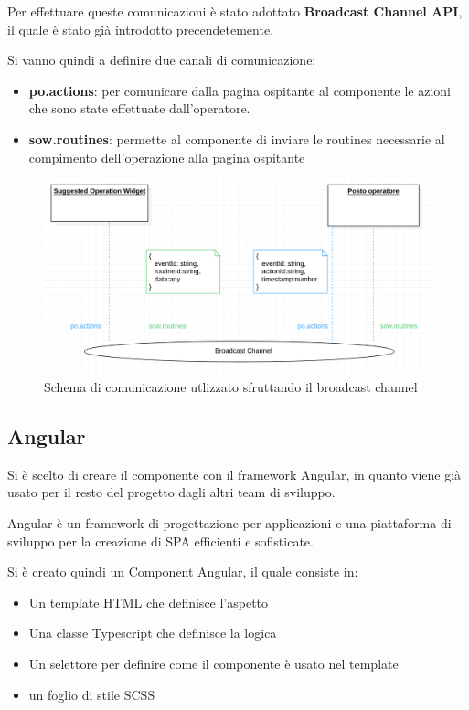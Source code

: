 Per effettuare queste comunicazioni è stato adottato \textbf{Broadcast Channel API}, il quale è stato già introdotto precendetemente.

Si vanno quindi a definire due canali di comunicazione:
\begin{itemize}
    \item \textbf{po.actions}: per comunicare dalla pagina ospitante al componente le azioni che sono state effettuate dall'operatore.
    \item \textbf{sow.routines}: permette al componente di inviare le routines necessarie al compimento dell'operazione alla pagina ospitante
\end{itemize}
\begin{figure}[H]
    \centering
    \includegraphics[width=140mm]{img/broadcast_channel}
    \caption{Schema di comunicazione utlizzato sfruttando il broadcast channel}
  \end{figure}


\pagebreak
\subsection{Angular}
Si è scelto di creare il componente con il framework Angular, in quanto viene già usato per 
il resto del progetto dagli altri team di sviluppo.

Angular è un framework di progettazione per applicazioni e una piattaforma di sviluppo per la creazione 
di SPA efficienti e sofisticate. \cite{angular}

Si è creato quindi un Component Angular, il quale consiste in:
\begin{itemize}
    \item Un template HTML che definisce l'aspetto
    \item Una classe Typescript che definisce la logica
    \item Un selettore per definire come il componente è usato nel template
    \item un foglio di stile SCSS
\end{itemize}

